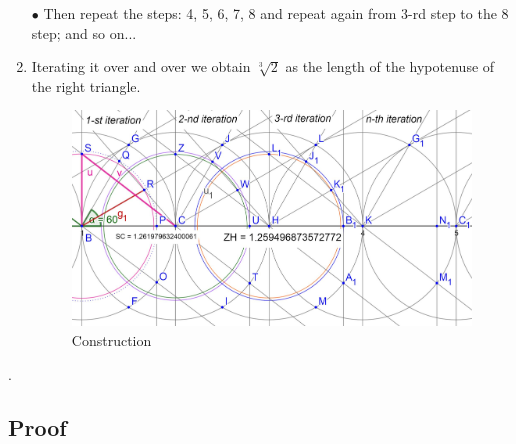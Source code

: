 \documentclass[12pt, letterpaper, oneside]{report}
\begin{document}
\begin{enumerate}
$\bullet$ Then repeat the steps: 4, 5, 6, 7, 8 and repeat again from 3-rd step to the 8 step; and so on...\\
	\item Iterating it over and over we obtain $\sqrt[3]{2}$ as the length of the hypotenuse of the right triangle.
\begin{figure}[h]
	\centering
	\includegraphics[width=0.7\linewidth]{iterations.jpg}
	\caption{Construction}
	\label{construction}
\end{figure}
\end{enumerate}.

\newpage

\subsection{Proof} 
\end{document}
